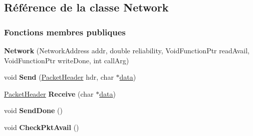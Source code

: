 \hypertarget{class_network}{}\subsection{Référence de la classe Network}
\label{class_network}
\subsubsection*{Fonctions membres publiques}
\begin{DoxyCompactItemize}
\item 
\hypertarget{class_network_a0293c87c8c600e73383252a7c54b7c74}{}\label{class_network_a0293c87c8c600e73383252a7c54b7c74} 
{\bfseries Network} (Network\+Address addr, double reliability, Void\+Function\+Ptr read\+Avail, Void\+Function\+Ptr write\+Done, int call\+Arg)
\item 
\hypertarget{class_network_ab68e75d65ef18f8a94a2f002c9e7f4ca}{}\label{class_network_ab68e75d65ef18f8a94a2f002c9e7f4ca} 
void {\bfseries Send} (\hyperlink{class_packet_header}{Packet\+Header} hdr, char $\ast$\hyperlink{structdata}{data})
\item 
\hypertarget{class_network_a65fc6c013612cd582c099e46c1395066}{}\label{class_network_a65fc6c013612cd582c099e46c1395066} 
\hyperlink{class_packet_header}{Packet\+Header} {\bfseries Receive} (char $\ast$\hyperlink{structdata}{data})
\item 
\hypertarget{class_network_ace79fd02d0d8404789162e991df951fe}{}\label{class_network_ace79fd02d0d8404789162e991df951fe} 
void {\bfseries Send\+Done} ()
\item 
\hypertarget{class_network_af33f61b6bb77606dc25805578e71abd0}{}\label{class_network_af33f61b6bb77606dc25805578e71abd0} 
void {\bfseries Check\+Pkt\+Avail} ()
\end{DoxyCompactItemize}
